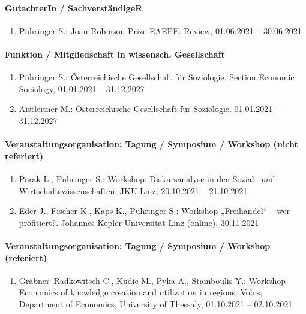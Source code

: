 \paragraph{GutachterIn / SachverständigeR}
\begin{enumerate}[leftmargin=*, labelsep=0.5cm]
\item Pühringer S.: Joan Robinson Prize EAEPE. Review, 01.06.2021 -- 30.06.2021
\end{enumerate}
\paragraph{Funktion / Mitgliedschaft in wissensch. Gesellschaft}
\begin{enumerate}[leftmargin=*, labelsep=0.5cm]
\item Pühringer S.: Österreichische Gesellschaft für Soziologie. Section Economic Sociology, 01.01.2021 -- 31.12.2027
\item Aistleitner M.: Österreichische Gesellschaft für Soziologie. 01.01.2021 -- 31.12.2027
\end{enumerate}
\paragraph{Veranstaltungsorganisation: Tagung / Symposium / Workshop (nicht referiert)}
\begin{enumerate}[leftmargin=*, labelsep=0.5cm]
\item Porak L., Pühringer S.: Workshop: Diskursanalyse in den Sozial-- und Wirtschaftswissenschaften. JKU Linz, 20.10.2021 -- 21.10.2021
\item Eder J., Fischer K., Kaps K., Pühringer S.: Workshop „Freihandel“ – wer profitiert?. Johannes Kepler Universität Linz (online), 30.11.2021
\end{enumerate}
\paragraph{Veranstaltungsorganisation: Tagung / Symposium / Workshop (referiert)}
\begin{enumerate}[leftmargin=*, labelsep=0.5cm]
\item Gräbner--Radkowitsch C., Kudic M., Pyka A., Stamboulis Y.: Workshop Economics of knowledge creation and utilization in regions. Volos, Department of Economics, University of Thessaly, 01.10.2021 -- 02.10.2021
\end{enumerate}
